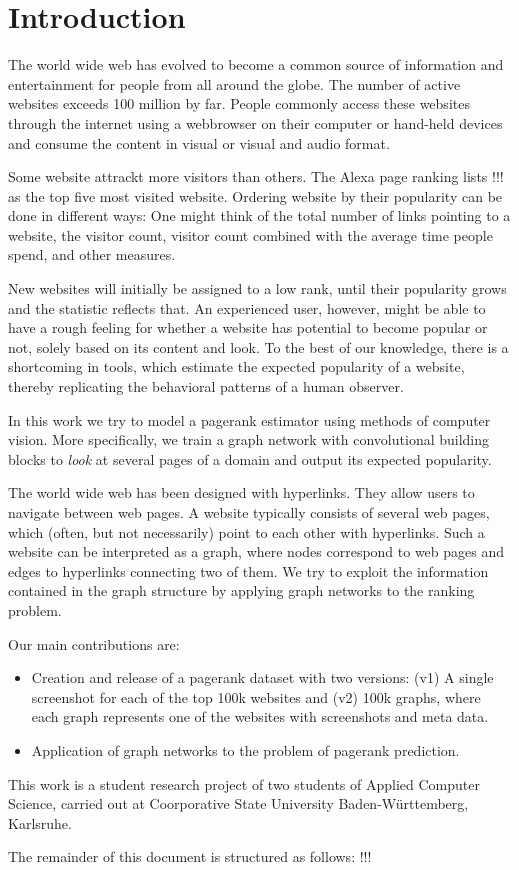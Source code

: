 \section{Introduction}

The world wide web has evolved to become a common source of information and entertainment for people from all around the globe. The number of active websites exceeds 100 million by far. People commonly access these websites through the internet using a webbrowser on their computer or hand-held devices and consume the content in visual or visual and audio format.

Some website attrackt more visitors than others. The Alexa page ranking lists !!! as the top five most visited website. Ordering website by their popularity can be done in different ways: One might think of the total number of links pointing to a website, the visitor count, visitor count combined with the average time people spend, and other measures.

New websites will initially be assigned to a low rank, until their popularity grows and the statistic reflects that. An experienced user, however, might be able to have a rough feeling for whether a website has potential to become popular or not, solely based on its content and look. To the best of our knowledge, there is a shortcoming in tools, which estimate the expected popularity of a website, thereby replicating the behavioral patterns of a human observer.

In this work we try to model a pagerank estimator using methods of computer vision. More specifically, we train a graph network with convolutional building blocks to \textit{look} at several pages of a domain and output its expected popularity.

The world wide web has been designed with hyperlinks. They allow users to navigate between web pages. A website typically consists of several web pages, which (often, but not necessarily) point to each other with hyperlinks. Such a website can be interpreted as a graph, where nodes correspond to web pages and edges to hyperlinks connecting two of them. We try to exploit the information contained in the graph structure by applying graph networks to the ranking problem.

Our main contributions are:
\begin{itemize}
\item Creation and release of a pagerank dataset with two versions: (v1) A single screenshot for each of the top 100k websites and (v2) 100k graphs, where each graph represents one of the websites with screenshots and meta data.
\item Application of graph networks to the problem of pagerank prediction.
\end{itemize}

This work is a student research project of two students of Applied Computer Science, carried out at Coorporative State University Baden-Württemberg, Karlsruhe.

The remainder of this document is structured as follows: !!!
